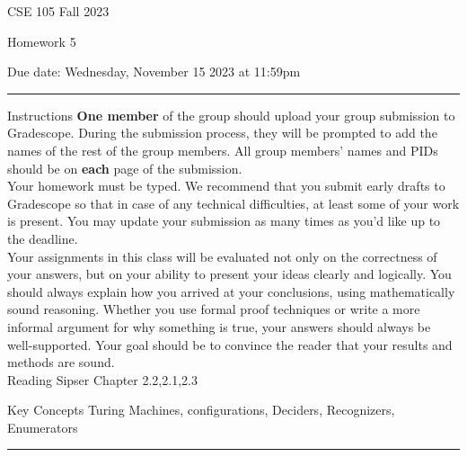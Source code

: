 \documentclass[10pt,letterpaper,unboxed,cm]{article}
\begin{document}
\hfill{CSE 105 Fall 2023}

\hfill{Homework 5}

\hfill{Due date: Wednesday, November 15 2023 at 11:59pm}

\begin{center}
\begin{minipage}[t]{5.7in}
\rule{\linewidth}{2pt}
{\sc Instructions}\newline
{\bf One member} of the group should upload your group submission to Gradescope.
During the submission process, they will be prompted to add the names of the rest
of the group members.
 All group members' names and PIDs
should be on {\bf each} page of the submission.\\


Your homework must be typed.  We recommend that you submit early drafts to Gradescope so that in 
case of any technical difficulties, at least some of your work is present.  You may update
your submission as many times as you'd like up to the deadline.\\


Your assignments in this class will be evaluated not only on the correctness of your answers, but on your ability to present your ideas clearly and logically. You should always explain how you arrived at your conclusions, using mathematically sound reasoning. Whether you use formal proof techniques or write a more informal argument for why something is true, your answers should always be well-supported. Your goal should be to convince the reader that your results and methods are sound.\\



{\sc Reading} Sipser Chapter 2.2,2.1,2.3
\newline

{\sc Key Concepts} 
Turing Machines, configurations, Deciders, Recognizers, Enumerators
\newline

\rule{\linewidth}{2pt}
\end{minipage} \hfill

\end{center}
\end{document}
